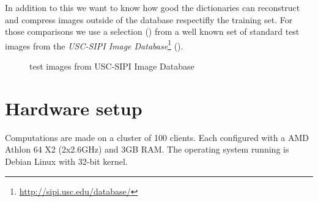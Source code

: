 In addition to this we want to know how good the dictionaries can reconstruct
and compress images outside of the database respectifly the training set. For
those comparisons we use a selection () from a
well known set of standard test images from the \emph{USC-SIPI Image
Database}\footnote{\url{http://sipi.usc.edu/database/}}
(). 
\begin{figure}[H]
\centering
\hspace{5mm}
\hspace{5mm}
\caption{test images from USC-SIPI Image Database}
\label{fig:USC-SIPI}
\end{figure}

\section{Hardware setup} 
Computations are made on a cluster of 100 clients. Each 
configured with a AMD Athlon 64 X2 (2x2.6GHz) and 3GB RAM.
The operating system running is Debian Linux with 32-bit kernel. 

